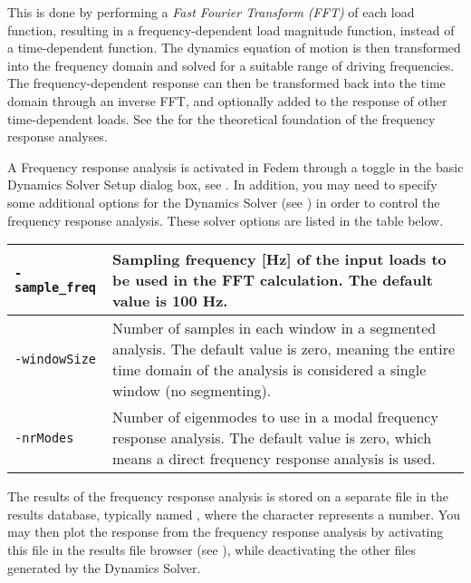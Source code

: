 {This is done by performing a {\sl Fast Fourier Transform (FFT)} of each load
function, resulting in a frequency-dependent load magnitude function, instead of
a time-dependent function. The dynamics equation of motion is then transformed
into the frequency domain and solved for a suitable range of driving
frequencies. The frequency-dependent response can then be transformed back into
the time domain through an inverse FFT, and optionally added to the response of
other time-dependent loads.
See the 
for the theoretical foundation of the frequency response analyses.

A Frequency response analysis is activated in Fedem through a toggle in
the basic Dynamics Solver Setup dialog box, see
.
In addition, you may need to specify some additional options for the Dynamics
Solver (see )
in order to control the frequency response analysis.
These solver options are listed in the table below.

\noindent
\begin{tabular}{ | m{22mm} | m{9cm}| }
  \hline{\tt-sample\_freq} &
  Sampling frequency [Hz] of the input loads to be used in the FFT calculation.
  The default value is 100 Hz. \\

  \hline{\tt-windowSize} &
  Number of samples in each window in a segmented analysis.
  The default value is zero, meaning the entire time domain of the analysis
  is considered a single window (no segmenting). \\

  \hline{\tt-nrModes} &
  Number of eigenmodes to use in a modal frequency response analysis.
  The default value is zero, which means a direct frequency response analysis
  is used. \\
  \hline
\end{tabular}

The results of the frequency response analysis is stored on a separate
 file in the results database, typically named ,
where the \File{\#} character represents a number.
You may then plot the response from the frequency response analysis by
activating this file in the results file browser (see
),
while deactivating the other  files generated by the Dynamics Solver.


}

